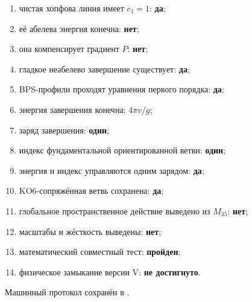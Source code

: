 \begin{protocol}
\begin{enumerate}
 \item чистая хопфова линия имеет $c_1=1$: \textbf{да};
 \item её абелева энергия конечна: \textbf{нет};
 \item она компенсирует градиент $P$: \textbf{нет};
 \item гладкое неабелево завершение существует: \textbf{да};
 \item BPS-профили проходят уравнения первого порядка: \textbf{да};
 \item энергия завершения конечна: \textbf{$4\pi v/g$};
 \item заряд завершения: \textbf{один};
 \item индекс фундаментальной ориентированной ветви: \textbf{один};
 \item энергия и индекс управляются одним зарядом: \textbf{да};
 \item KO6-сопряжённая ветвь сохранена: \textbf{да};
 \item глобальное пространственное действие выведено из $M_{35}$:
 \textbf{нет};
 \item масштабы и жёсткость выведены: \textbf{нет};
 \item математический совместный тест: \textbf{пройден};
 \item физическое замыкание версии V: \textbf{не достигнуто}.
\end{enumerate}
\end{protocol}

Машинный протокол сохранён в
.